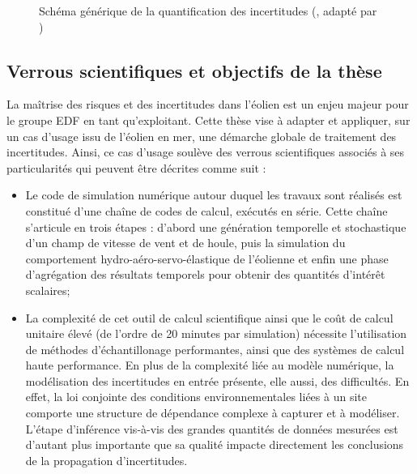 \begin{figure}[!h]
    \centering
    
    \caption{Schéma générique de la quantification des incertitudes (\cite{rocquigny_2008}, adapté par \cite{ajenjo_2023})}
    \label{fig:UQ_methodo_FR}
\end{figure}


\subsection*{Verrous scientifiques et objectifs de la thèse}

La maîtrise des risques et des incertitudes dans l'éolien est un enjeu majeur pour le groupe EDF en tant qu'exploitant. 
Cette thèse vise à adapter et appliquer, sur un cas d'usage issu de l'éolien en mer, une démarche globale de traitement des incertitudes. 
Ainsi, ce cas d'usage soulève des verrous scientifiques associés à ses particularités qui peuvent être décrites comme suit :
\begin{itemize}
    \item[\textbullet] 
    Le code de simulation numérique autour duquel les travaux sont réalisés est constitué d'une chaîne de codes de calcul, exécutés en série. 
    Cette chaîne s'articule en trois étapes : d'abord une génération temporelle et stochastique d'un champ de vitesse de vent et de houle, puis la simulation du comportement hydro-aéro-servo-élastique de l'éolienne et enfin une phase d'agrégation des résultats temporels pour obtenir des quantités d'intérêt scalaires;
    \item[\textbullet] 
    La complexité de cet outil de calcul scientifique ainsi que le coût de calcul unitaire élevé (de l'ordre de 20 minutes par simulation) nécessite l'utilisation de méthodes d'échantillonage performantes, ainsi que des systèmes de calcul haute performance. 
    En plus de la complexité liée au modèle numérique, la modélisation des incertitudes en entrée présente, elle aussi, des difficultés. 
    En effet, la loi conjointe des conditions environnementales liées à un site comporte une structure de dépendance complexe à capturer et à modéliser. 
    L'étape d'inférence vis-à-vis des grandes quantités de données mesurées est d'autant plus importante que sa qualité impacte directement les conclusions de la propagation d'incertitudes.
\end{itemize}

